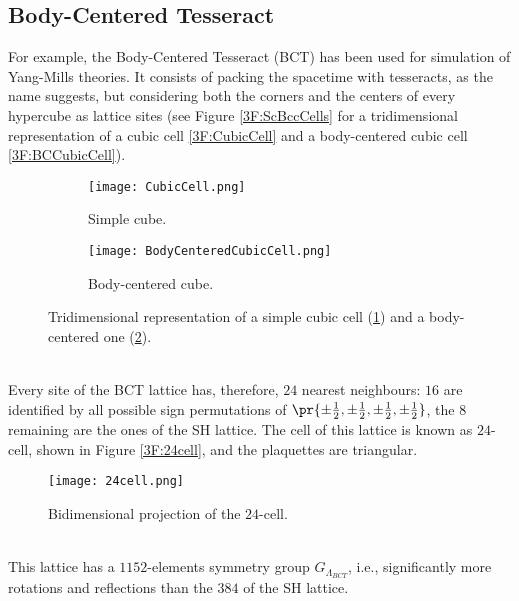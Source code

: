 \subsection{Body-Centered Tesseract\label{Sec3:BCT}}
For example, the Body-Centered Tesseract (BCT) has been used for simulation of Yang-Mills theories.
It consists of packing the spacetime with tesseracts, as the name suggests, but considering both the corners and the centers of every hypercube as lattice sites (see Figure \eqref{3F:ScBccCells} for a tridimensional representation of a cubic cell \eqref{3F:CubicCell} and a body-centered cubic cell \eqref{3F:BCCubicCell}).\\
\begin{figure}[!htbp]
    \centering
    \hspace{0.1\textwidth}
    \begin{subfigure}[b]{0.25\textwidth}
        \texttt{[image: CubicCell.png]}
        \caption{Simple cube.}
        \label{3F:CubicCell}
    \end{subfigure}
    \hspace{0.2\textwidth}
    \begin{subfigure}[b]{0.25\textwidth}
        \texttt{[image: BodyCenteredCubicCell.png]}
        \caption{Body-centered cube.}
        \label{3F:BCCubicCell}
    \end{subfigure}
    \hspace{0.2\textwidth}
    \caption{Tridimensional representation of a simple cubic cell (\ref{3F:CubicCell}) and a body-centered one (\ref{3F:BCCubicCell}).}
    \label{3F:ScBccCells}
\end{figure}\\
Every site of the BCT lattice has, therefore, $24$ nearest neighbours: $16$ are identified by all possible sign permutations of $\pr{\pm\frac12,\pm\frac12,\pm\frac12,\pm\frac12}$, the $8$ remaining are the ones of the SH lattice.
The cell of this lattice is known as $24$-cell, shown in Figure \eqref{3F:24cell}, and the plaquettes are triangular.
\begin{figure}[!htbp]
    \centering
    \texttt{[image: 24cell.png]}
    \caption{Bidimensional projection of the $24$-cell.}
    \label{3F:24cell}
\end{figure}\\
This lattice has a $1152$-elements symmetry group $G_{\Lambda_{BCT}}$, i.e., significantly more rotations and reflections than the $384$ of the SH lattice.

